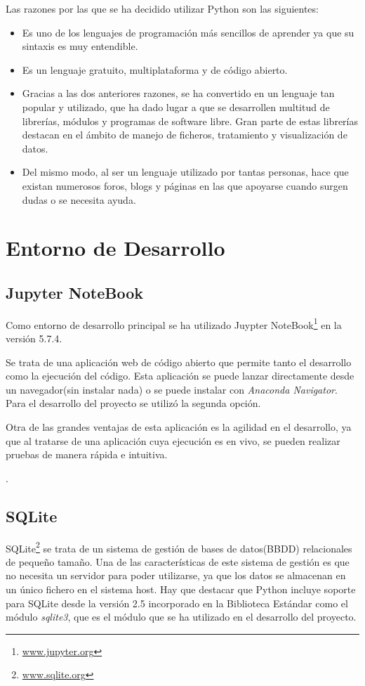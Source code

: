 Las razones por las que se ha decidido utilizar Python son las siguientes:
\begin{itemize}
	\item Es uno de los lenguajes de programación más sencillos de aprender ya que su sintaxis es muy entendible.
	\item Es un lenguaje gratuito, multiplataforma y de código abierto.
	\item Gracias a las dos anteriores razones, se ha convertido en un lenguaje tan popular y utilizado, que ha dado lugar a que se desarrollen multitud de librerías, módulos y programas de software libre. Gran parte de estas librerías destacan en el ámbito de manejo de ficheros, tratamiento y visualización de datos.
	\item Del mismo modo, al ser un lenguaje utilizado por tantas personas, hace que existan numerosos foros, blogs y páginas en las que apoyarse cuando surgen dudas o se necesita ayuda.
\end{itemize}


\section{Entorno de Desarrollo}\label{entorno_de_desarrollo}
\subsection{Jupyter NoteBook}\label{jupyter_noteBook}
Como entorno de desarrollo principal se ha utilizado Juypter NoteBook\footnote{\href {https://jupyter.org/}{www.jupyter.org}} en la versión 5.7.4.

Se trata de una aplicación web de código abierto que permite tanto el desarrollo como la ejecución del código.
Esta aplicación se puede lanzar directamente desde un navegador(sin instalar nada) o se puede instalar con \emph{Anaconda Navigator}. Para el desarrollo del proyecto se utilizó la segunda opción.

Otra de las grandes ventajas de esta aplicación es la agilidad en el desarrollo, ya que al tratarse de una aplicación cuya ejecución es en vivo, se pueden realizar pruebas de manera rápida e intuitiva. 

\cite{koza92}.

\subsection{SQLite}\label{sqlite}
SQLite\footnote{\href {https://www.sqlite.org/index.html}{www.sqlite.org}} se trata de un sistema de gestión de bases de datos(BBDD) relacionales de pequeño tamaño.
Una de las características de este sistema de gestión es que no necesita un servidor para poder utilizarse, ya que los datos se almacenan en un único fichero en el sistema host. 
Hay que destacar que Python incluye soporte para SQLite desde la versión 2.5 incorporado en la Biblioteca Estándar como el módulo \emph{sqlite3}, que es el módulo que se ha utilizado en el desarrollo del proyecto.

